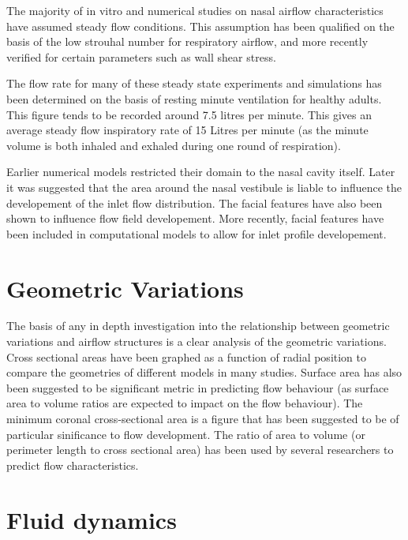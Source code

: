 The majority of in vitro and numerical studies on nasal airflow characteristics have assumed steady flow conditions\cite{Doorly2008c, Keyhani1995, Subramaniam1998, Wen2008}. This assumption has been qualified on the basis of the low strouhal number for respiratory airflow\cite{Keyhani1995}, and more recently verified for certain parameters such as wall shear stress\cite{Doorly2008c}.

The flow rate for many of these steady state experiments and simulations has been determined on the basis of resting minute ventilation for healthy adults\cite{Subramaniam1998, Wen2008}. This figure tends to be recorded around 7.5 litres per minute\cite{Chaya2006, Tobin1983}. This gives an average steady flow inspiratory rate of 15 Litres per minute (as the minute volume is both inhaled and exhaled during one round of respiration)\cite{Subramaniam1998}.

Earlier numerical models restricted their domain to the nasal cavity itself\cite{Keyhani1995, Subramaniam1998, Wen2008}. Later it was suggested that the area around the nasal vestibule is liable to influence the developement of the inlet flow distribution\cite{Doorly2008}. The facial features have also been shown to influence flow field developement\cite{Anthony2005}. More recently, facial features have been included in computational models to allow for inlet profile developement\cite{Li2012, Lee2010}.

\section{Geometric Variations}
The basis of any in depth investigation into the relationship between geometric variations and airflow structures is a clear analysis of the geometric variations. Cross sectional areas have been graphed as a function of radial position to compare the geometries of different models in many studies\cite{Xi2012, Zhu2011, Lindemann2008, Garcia2007}. Surface area has also been suggested to be significant metric in predicting flow behaviour (as surface area to volume ratios are expected to impact on the flow behaviour\cite{Xi2012, Garcia2007}). The minimum coronal cross-sectional area is a figure that has been suggested to be of particular sinificance to flow development\cite{Lindemann2008}. The ratio of area to volume (or perimeter length to cross sectional area) has been used by several researchers to predict flow characteristics\cite{Xi2012, Garcia2007}.

\section{Fluid dynamics}



